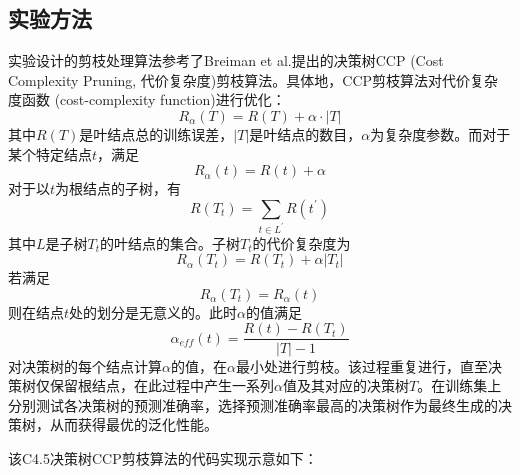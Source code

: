 \documentclass[12pt]{article}
\begin{document}
\subsection{实验方法}
实验设计的剪枝处理算法参考了Breiman et al.提出的决策树CCP (Cost Complexity Pruning, 代价复杂度)剪枝算法\citealp{breiman}。具体地，CCP剪枝算法对代价复杂度函数 (cost-complexity function)进行优化：
$$
R_\alpha (T) = R(T) + \alpha \cdot | T |
$$
其中$R(T)$是叶结点总的训练误差，$|T|$是叶结点的数目，$\alpha$为复杂度参数。而对于某个特定结点$t$，满足
$$
R_\alpha (t) = R(t) + \alpha 
$$
对于以$t$为根结点的子树，有
$$R(T_{t})=\sum_{t\in L^{\prime}}R(t^{\prime})$$
其中$L$是子树$T_{t}$的叶结点的集合。子树$T_{t}$的代价复杂度为
$$
R_{\alpha}(T_{t})=R(T_{t})+\alpha|T_{t}|
$$
若满足
$$
R_{\alpha}(T_{t})=R_{\alpha}(t)
$$
则在结点$t$处的划分是无意义的。此时$\alpha$的值满足
$$
\alpha_{eff}(t)=\frac{R(t)-R(T_{t})}{|T|-1}
$$
对决策树的每个结点计算$\alpha$的值，在$\alpha$最小处进行剪枝。该过程重复进行，直至决策树仅保留根结点，在此过程中产生一系列$\alpha$值及其对应的决策树$T$。在训练集上分别测试各决策树的预测准确率，选择预测准确率最高的决策树作为最终生成的决策树，从而获得最优的泛化性能。\par 
该C4.5决策树CCP剪枝算法的代码实现示意如下：
\end{document}
